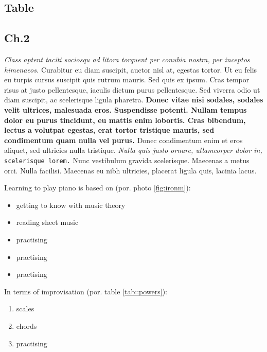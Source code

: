 \subsection{Table}

 
\subsection{Ch.2}
\textit{Class aptent taciti sociosqu ad litora torquent per conubia nostra, per inceptos himenaeos.} Curabitur eu diam suscipit, auctor nisl at, egestas tortor. Ut eu felis eu turpis cursus suscipit quis rutrum mauris. Sed quis ex ipsum. Cras tempor risus at justo pellentesque, iaculis dictum purus pellentesque. Sed viverra odio ut diam suscipit, ac scelerisque ligula pharetra. \textbf{Donec vitae nisi sodales, sodales velit ultrices, malesuada eros. Suspendisse potenti. Nullam tempus dolor eu purus tincidunt, eu mattis enim lobortis. Cras bibendum, lectus a volutpat egestas, erat tortor tristique mauris, sed condimentum quam nulla vel purus.} Donec condimentum enim et eros aliquet, sed ultricies nulla tristique. \emph{Nulla quis justo ornare, ullamcorper dolor in,} \texttt{scelerisque lorem.} Nunc vestibulum gravida scelerisque. Maecenas a metus orci. Nulla facilisi. Maecenas eu nibh ultricies, placerat ligula quis, lacinia lacus. \newline

\setlength{\parindent}{0pt}
Learning to play piano is based on (por. photo \ref{fig:ironm}):
\begin{itemize}
    \item getting to know with music theory
    \item reading sheet music
    \item practising
    \item practising
    \item practising
\end{itemize}
In terms of improvisation (por. table \ref{tab::powers}):
\begin{enumerate}
    \item scales
    \item chords
    \item practising
\end{enumerate}

\newpage